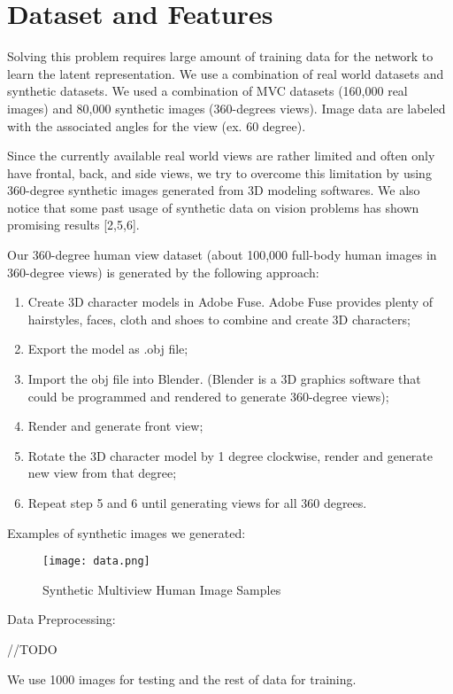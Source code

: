 \documentclass[10pt,conference]{IEEEtran}
\begin{document}
\section{Dataset and Features}
Solving this problem requires large amount of training data for the network to learn the latent representation. We use a combination of real world datasets and synthetic datasets. We used a combination of MVC datasets (160,000 real images) and 80,000 synthetic images (360-degrees views). Image data are labeled with the associated angles for the view (ex. 60 degree).

Since the currently available real world views are rather limited and often only have frontal, back, and side views, we try to overcome this limitation by using 360-degree synthetic images generated from 3D modeling softwares. We also notice that some past usage of synthetic data on vision problems has shown promising results [2,5,6].

Our 360-degree human view dataset (about 100,000 full-body human images in 360-degree views) is generated by the following approach:
\renewcommand{\labelenumi}{\roman{enumi}}
 \begin{enumerate}
   \item Create 3D character models in Adobe Fuse. Adobe Fuse provides plenty of hairstyles, faces, cloth and shoes to combine and create 3D characters;
   \item Export the model as .obj file;
   \item Import the obj file into Blender. (Blender is a 3D graphics software that could be programmed and rendered to generate 360-degree views);
   \item Render and generate front view;
   \item Rotate the 3D character model by 1 degree clockwise, render and generate new view from that degree;
   \item Repeat step 5 and 6 until generating views for all 360 degrees.   
 \end{enumerate}

Examples of synthetic images we generated:

\begin{figure}[htbp]
\centering
\texttt{[image: data.png]}
\caption{Synthetic Multiview Human Image Samples}
\end{figure}

Data Preprocessing:

//TODO

We use 1000 images for testing and the rest of data for training.
\end{document}
